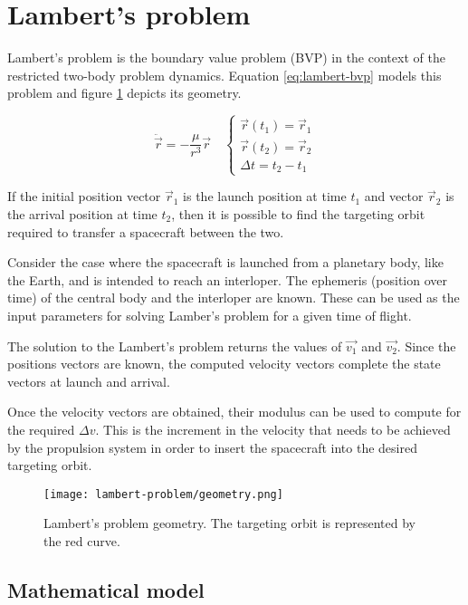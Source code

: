 \section{Lambert's problem}

Lambert's problem is the boundary value problem (BVP) in the context of the
restricted two-body problem dynamics. Equation \ref{eq:lambert-bvp} models this
problem and figure \ref{fig:lambert-geometry} depicts its geometry.

\begin{equation}
  \ddot{\vec{r}} = -\frac{\mu}{r^3}\vec{r} \quad \begin{cases}
    \vec{r}(t_1) = \vec{r}_1 \\
    \vec{r}(t_2) = \vec{r}_2 \\
    \Delta t = t_2 - t_1
  \end{cases}
  \label{eq:lambert-bvp}
\end{equation}

If the initial position vector $\vec{r}_1$ is the launch position at time
$t_1$ and vector $\vec{r}_2$ is the arrival position at time $t_2$,
then it is possible to find the targeting orbit required to transfer a
spacecraft between the two.

Consider the case where the spacecraft is launched from a planetary body, like
the Earth, and is intended to reach an interloper. The ephemeris (position over
time) of the central body and the interloper are known. These can be used as the
input parameters for solving Lamber's problem for a given time of flight.

The solution to the Lambert's problem returns the values of $\vec{v_1}$ and
$\vec{v_2}$. Since the positions vectors are known, the computed velocity
vectors complete the state vectors at launch and arrival.

Once the velocity vectors are obtained, their modulus can be used to compute for
the required $\Delta v$. This is the increment in the velocity that needs to be
achieved by the propulsion system in order to insert the spacecraft into the
desired targeting orbit.

\begin{figure}[H]
  \centering
  \texttt{[image: lambert-problem/geometry.png]}
  \caption{Lambert's problem geometry. The targeting orbit is represented by the red curve.}
  \label{fig:lambert-geometry}
\end{figure}

\subsection{Mathematical model}

